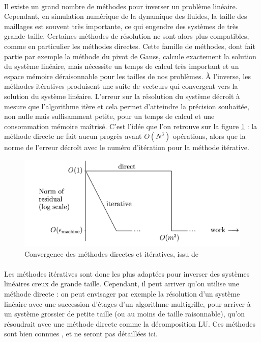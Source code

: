 		\paragraph{}
		Il existe un grand nombre de méthodes pour inverser un problème linéaire.
		Cependant, en simulation numérique de la dynamique des fluides, la taille des maillages est souvent très importante, ce qui engendre des systèmes de très grande taille.
		Certaines méthodes de résolution ne sont alors plus compatibles, comme en particulier les méthodes directes.
		Cette famille de méthodes, dont fait partie par exemple la méthode du pivot de Gauss, calcule exactement la solution du système linéaire, mais nécessite un temps de calcul très important et un espace mémoire déraisonnable pour les tailles de nos problèmes.
		À l'inverse, les méthodes itératives produisent une suite de vecteurs qui convergent vers la solution du système linéaire.
		L'erreur sur la résolution du système décroît à mesure que l'algorithme itère et cela permet d'atteindre la précision souhaitée, non nulle mais suffisamment petite, pour un temps de calcul et une consommation mémoire maîtrisé.
		C'est l'idée que l'on retrouve sur la figure \ref{fig:direct-iterative} : la méthode directe ne fait aucun progrès avant $O\left(N^3\right)$ opérations, alors que la norme de l'erreur décroît avec le numéro d'itération pour la méthode itérative.

		\begin{figure}
			\centering
			\includegraphics[width=.7\textwidth]{images/direct-iterative.png}
			\caption{Convergence des méthodes directes et itératives, issu de \cite{TrefethenBau1997}}
			\label{fig:direct-iterative}
		\end{figure}

		\paragraph{}
		Les méthodes itératives sont donc les plus adaptées pour inverser des systèmes linéaires creux de grande taille.
		Cependant, il peut arriver qu'on utilise une méthode directe : on peut envisager par exemple la résolution d'un système linéaire avec une succession d'étages d'un algorithme multigrille, pour arriver à un système grossier de petite taille (ou au moins de taille raisonnable), qu'on résoudrait avec une méthode directe comme la décomposition LU.
		Ces méthodes sont bien connues \cite{TrefethenBau1997}, et ne seront pas détaillées ici.


